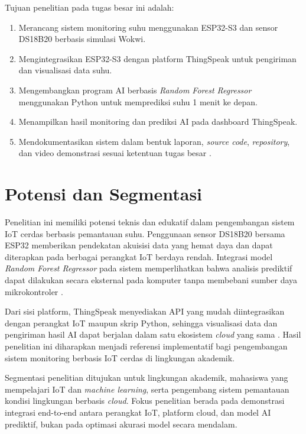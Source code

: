 Tujuan penelitian pada tugas besar ini adalah:

\begin{enumerate}
    \item Merancang sistem monitoring suhu menggunakan ESP32-S3 dan sensor
    DS18B20 berbasis simulasi Wokwi.
    \item Mengintegrasikan ESP32-S3 dengan platform ThingSpeak untuk
    pengiriman dan visualisasi data suhu.
    \item Mengembangkan program AI berbasis \textit{Random Forest Regressor}
    menggunakan Python untuk memprediksi suhu 1 menit ke depan.
    \item Menampilkan hasil monitoring dan prediksi AI pada dashboard
    ThingSpeak.
    \item Mendokumentasikan sistem dalam bentuk laporan, \textit{source code},
    \textit{repository}, dan video demonstrasi sesuai ketentuan tugas besar
    \cite{tugasbesar2026}.
\end{enumerate}

\section{Potensi dan Segmentasi}

Penelitian ini memiliki potensi teknis dan edukatif dalam pengembangan sistem
IoT cerdas berbasis pemantauan suhu. Penggunaan sensor DS18B20 bersama
ESP32 memberikan pendekatan akuisisi data yang hemat daya dan dapat
diterapkan pada berbagai perangkat IoT berdaya rendah. Integrasi model
\textit{Random Forest Regressor} pada sistem memperlihatkan bahwa analisis
prediktif dapat dilakukan secara eksternal pada komputer tanpa membebani
sumber daya mikrokontroler \cite{breiman2001}.

Dari sisi platform, ThingSpeak menyediakan API yang mudah diintegrasikan
dengan perangkat IoT maupun skrip Python, sehingga visualisasi data dan
pengiriman hasil AI dapat berjalan dalam satu ekosistem \textit{cloud}
yang sama \cite{thingspeak2024}. Hasil penelitian ini diharapkan menjadi
referensi implementatif bagi pengembangan sistem monitoring berbasis IoT
cerdas di lingkungan akademik.

Segmentasi penelitian ditujukan untuk lingkungan akademik, mahasiswa yang
mempelajari IoT dan \textit{machine learning}, serta pengembang sistem
pemantauan kondisi lingkungan berbasis \textit{cloud}. Fokus penelitian
berada pada demonstrasi integrasi end-to-end antara perangkat IoT,
platform cloud, dan model AI prediktif, bukan pada optimasi akurasi
model secara mendalam.

